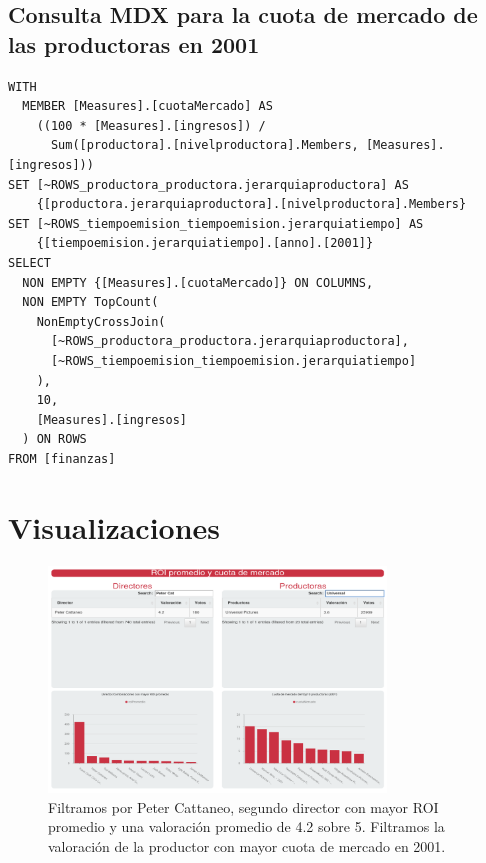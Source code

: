\documentclass[11pt]{opticajnl}
\begin{document}
\subsection{Consulta MDX para la cuota de mercado de las productoras en 2001}

\begin{lstlisting}[style=terminal]
WITH
  MEMBER [Measures].[cuotaMercado] AS
    ((100 * [Measures].[ingresos]) / 
      Sum([productora].[nivelproductora].Members, [Measures].[ingresos]))
SET [~ROWS_productora_productora.jerarquiaproductora] AS
    {[productora.jerarquiaproductora].[nivelproductora].Members}
SET [~ROWS_tiempoemision_tiempoemision.jerarquiatiempo] AS
    {[tiempoemision.jerarquiatiempo].[anno].[2001]}
SELECT
  NON EMPTY {[Measures].[cuotaMercado]} ON COLUMNS,
  NON EMPTY TopCount(
    NonEmptyCrossJoin(
      [~ROWS_productora_productora.jerarquiaproductora], 
      [~ROWS_tiempoemision_tiempoemision.jerarquiatiempo]
    ), 
    10, 
    [Measures].[ingresos]
  ) ON ROWS
FROM [finanzas]
\end{lstlisting}



\section{Visualizaciones}

\begin{figure}[H]
\centering
\includegraphics[width=0.8\textwidth]{fotos/1.png}
\caption{Filtramos por Peter Cattaneo, segundo director con mayor ROI promedio y una valoración promedio de 4.2 sobre 5. Filtramos la valoración de la productor con mayor cuota de mercado en 2001.}
\end{figure}
\end{document}

